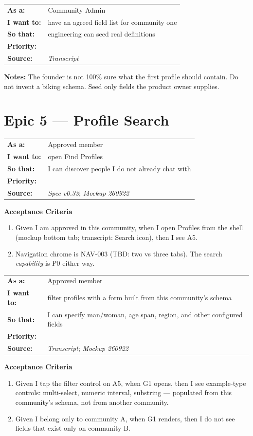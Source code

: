 \documentclass[11pt,a4paper]{article}
\makeatletter
\newcommand{\priPzero}{\colorbox{p0}{\makebox[4.6em]{\textcolor{white}{\scriptsize\bfseries P0 V1}}}}
\newcommand{\priTBD}{\colorbox{tbd}{\makebox[4.6em]{\textcolor{white}{\scriptsize\bfseries TBD}}}}
\newcommand{\srcSpec}{\textit{Spec v0.33}}
\newcommand{\srcTx}{\textit{Transcript}}
\newcommand{\srcMock}{\textit{Mockup 260922}}
\newenvironment{story}[1]{%
  \Needspace{10\baselineskip}%
  \vspace{0.7em}%
  \noindent
  \colorbox{navy}{\makebox[\dimexpr\textwidth-2\fboxsep\relax][l]{\textcolor{white}{\bfseries\ #1}}}%
  \par\vspace{0.35em}%
}{\par\vspace{0.55em}}
\newcommand{\storymeta}[5]{%
  \noindent
  \begin{tabularx}{\textwidth}{@{}>{\bfseries}l X@{}}
    As a: & #1 \\
    I want to: & #2 \\
    So that: & #3 \\
    Priority: & #4 \\
    Source: & #5 \\
  \end{tabularx}
  \par\vspace{0.3em}
}
\newcommand{\achead}{\noindent\textbf{Acceptance Criteria}\par}
\newcommand{\notes}[1]{\noindent\textbf{Notes:} #1\par}
\makeatother
\begin{document}
\begin{story}{DYN-006 --- First community's concrete field list}
\storymeta{Community Admin}{have an agreed field list for community one}{engineering can seed real definitions}{\priTBD}{\srcTx}
\notes{The founder is not 100\% sure what the first profile should contain. Do not invent a biking schema. Seed only fields the product owner supplies.}
\end{story}

\section{Epic 5 --- Profile Search}

\begin{story}{SEARCH-001 --- Open profile search (A5)}
\storymeta{Approved member}{open Find Profiles}{I can discover people I do not already chat with}{\priPzero}{\srcSpec; \srcMock}
\achead
\begin{enumerate}
  \item Given I am approved in this community, when I open Profiles from the shell (mockup bottom tab; transcript: Search icon), then I see A5.
  \item Navigation chrome is NAV-003 (TBD: two vs three tabs). The search \emph{capability} is P0 either way.
\end{enumerate}
\end{story}

\begin{story}{SEARCH-002 --- Filter form G1}
\storymeta{Approved member}{filter profiles with a form built from this community's schema}{I can specify man/woman, age span, region, and other configured fields}{\priPzero}{\srcTx; \srcMock}
\achead
\begin{enumerate}
  \item Given I tap the filter control on A5, when G1 opens, then I see example-type controls: multi-select, numeric interval, substring --- populated from this community's schema, not from another community.
  \item Given I belong only to community A, when G1 renders, then I do not see fields that exist only on community B.
\end{enumerate}
\end{story}
\end{document}
